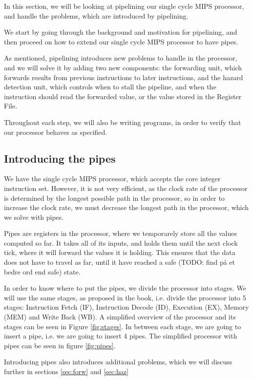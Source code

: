 In this section, we will be looking at pipelining our single cycle MIPS
processor, and handle the problems, which are introduced by pipelining.

We start by going through the background and motivation for pipelining, and
then proceed on how to extend our single cycle MIPS processor to have pipes.

As mentioned, pipelining introduces new problems to handle in the processor,
and we will solve it by adding two new components: the forwarding unit, which
forwards results from previous instructions to later instructions, and the
hazard detection unit, which controls when to stall the pipeline, and when the
instruction should read the forwarded value, or the value stored in the
Register File.

Throughout each step, we will also be writing programs, in order to verify that
our processor behaves as specified.

\subsection{Introducing the pipes}
We have the single cycle MIPS processor, which accepts the core integer
instruction set. However, it is not very efficient, as the clock rate of the
processor is determined by the longest possible path in the processor, so in
order to increase the clock rate, we must decrease the longest path in the
processor, which we solve with pipes.

Pipes are registers in the processor, where we temporarely store all the values
computed so far. It takes all of its inputs, and holds them until the next
clock tick, where it will forward the values it is holding. This ensures that
the data does not have to travel as far, until it have reached a safe (TODO:
find på et bedre ord end safe) state.

In order to know where to put the pipes, we divide the processor into stages.
We will use the same stages, as proposed in the book\cite{ref:ark}, i.e. divide
the processor into 5 stages: Instruction Fetch (IF), Instruction Decode (ID),
Execution (EX), Memory (MEM) and Write Back (WB). A simplified overview of the
processor and its stages can be seen in Figure \ref{fig:stages}. In between
each stage, we are going to insert a pipe, i.e. we are going to insert 4 pipes.
The simplified processor with pipes can be seen in figure \ref{fig:pipes}.

Introducing pipes also introduces additional problems, which we will discuss
further in sections \ref{sec:forw} and \ref{sec:haz}


